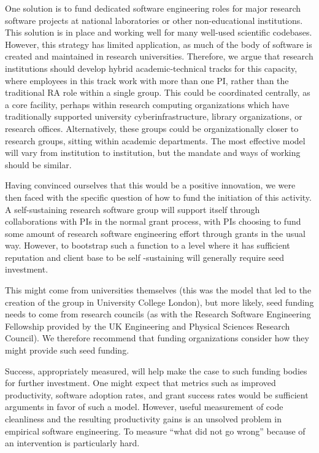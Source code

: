 One solution is to fund dedicated software engineering roles for major research
software projects at national laboratories or other non-educational
institutions. This solution is in place and working well for many well-used
scientific codebases. However, this strategy has limited application, as much of
the body of software is created and maintained in research universities.
Therefore, we argue that research institutions should develop hybrid
academic-technical tracks for this capacity, where employees in this track work
with more than one PI, rather than the traditional RA role within a single
group. This could be coordinated centrally, as a core facility, perhaps within
research computing organizations which have traditionally supported university
cyberinfrastructure, library organizations, or research offices. Alternatively,
these groups could be organizationally closer to research groups, sitting within
academic departments. The most effective model will vary from institution to
institution, but the mandate and ways of working should be similar.

Having convinced ourselves that this would be a positive innovation, we were
then faced with the specific question of how to fund the initiation of this
activity. A self-sustaining research software group will support itself through
collaborations with PIs in the normal grant process, with PIs choosing to fund
some amount of research software engineering effort through grants in the usual
way. However, to bootstrap such a function to a level where it has sufficient
reputation and client base to be self -sustaining will generally require seed
investment.

This might come from universities themselves (this was the model that led to the
creation of the group in University College London), but more likely, seed
funding needs to come from research councils (as with the Research Software
Engineering Fellowship provided by the UK Engineering and Physical Sciences
Research Council). We therefore recommend that funding organizations consider
how they might provide such seed funding.

Success, appropriately measured, will help make the case to such funding bodies
for further investment. One might expect that metrics such as improved
productivity, software adoption rates, and grant success rates would be
sufficient arguments in favor of such a model. However, useful measurement of
code cleanliness and the resulting productivity gains is an unsolved problem
in empirical software engineering. To measure ``what did not go wrong'' because
of an intervention is particularly hard.


